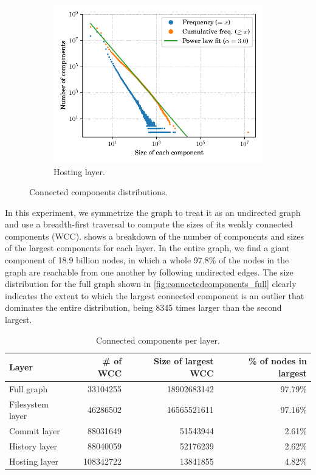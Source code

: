 \begin{figure}
\begin{subfigure}{.49\textwidth}
        \includegraphics[width=\linewidth]{img/topology/connectedcomponents/ori+snp}
        \caption{Hosting layer.}%
        \label{fig:connectedcomponents_ori+snp}
    \end{subfigure}

    \caption{Connected components distributions.}%
    \label{fig:connectedcomponents}
\end{figure}

In this experiment, we symmetrize the graph to treat it as an undirected graph
and use a breadth-first traversal to compute the sizes of its weakly connected
components (WCC).  shows a breakdown of the number of
components and sizes of the largest components for each layer. In the entire
graph, we find a giant component of 18.9 billion nodes, in which a whole 97.8\%
of the nodes in the graph are reachable from one another by following
undirected edges. The size distribution for the full graph shown in
\cref{fig:connectedcomponents_full} clearly indicates the extent to which the
largest connected component is an outlier that dominates the entire
distribution, being 8345 times larger than the second largest.

\begin{table}
  \centering
  \caption{Connected components per layer.}%
  \label{tab:wcc-stats}
  \begin{tabular}[t]{l r r r}
      \textbf{Layer} & \textbf{\# of WCC}
                     & \textbf{Size of largest WCC}
                     & \textbf{\% of nodes in largest}
                     \\
    \hline
      Full graph       & \num{33104255}  & \num{18902683142} & 97.79\% \\
      Filesystem layer & \num{46286502}  & \num{16565521611} & 97.16\% \\
      Commit layer     & \num{88031649}  & \num{51543944}    & 2.61\% \\
      History layer    & \num{88040059}  & \num{52176239}    & 2.62\% \\
      Hosting layer    & \num{108342722} & \num{13841855}    & 4.82\%
  \end{tabular}
\end{table}


